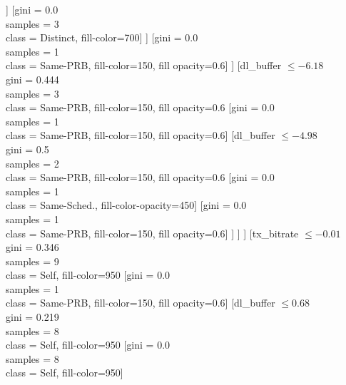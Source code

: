 \documentclass[tikz,multi,border=1pt]{standalone}
\begin{document}
\begin{forest}
                      [{gini = 0.0} \\ {samples = 1}\\ {class = Same-Sched.}, fill-color-opacity=450]
                      [{gini = 0.0} \\ {samples = 1}\\ {class = Distinct}, fill-color=700]
                	]
                    [{gini = 0.0} \\ {samples = 3}\\ {class = Distinct}, fill-color=700]
              	  ]
                  [{gini = 0.0} \\ {samples = 1}\\ {class = Same-PRB}, fill-color=150, fill opacity=0.6]
                ]
                [dl\_buffer $\leq -6.18$\\ {gini = 0.444} \\ {samples = 3}\\ {class = Same-PRB}, fill-color=150, fill opacity=0.6
                  [{gini = 0.0} \\ {samples = 1}\\ {class = Same-PRB}, fill-color=150, fill opacity=0.6]
                  [dl\_buffer $\leq -4.98$\\ {gini = 0.5} \\ {samples = 2}\\ {class = Same-PRB}, fill-color=150, fill opacity=0.6
                    [{gini = 0.0} \\ {samples = 1}\\ {class = Same-Sched.}, fill-color-opacity=450]
                    [{gini = 0.0} \\ {samples = 1}\\ {class = Same-PRB}, fill-color=150, fill opacity=0.6]
                  ]
                ]
              ]
              [tx\_bitrate $\leq -0.01$\\ {gini = 0.346} \\ {samples = 9}\\ {class = Self}, fill-color=950
                [{gini = 0.0} \\ {samples = 1}\\ {class = Same-PRB}, fill-color=150, fill opacity=0.6]
                [dl\_buffer $\leq 0.68$\\ {gini = 0.219} \\ {samples = 8}\\ {class = Self}, fill-color=950
                  [{gini = 0.0} \\ {samples = 8}\\ {class = Self}, fill-color=950]

\end{forest}
\end{document}
